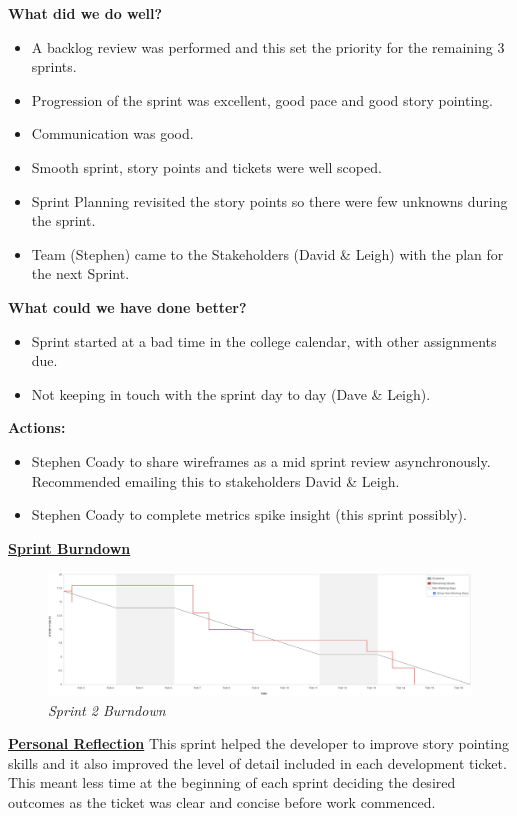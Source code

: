 \textbf{What did we do well?}
\begin{itemize}
	\item A backlog review was performed and this set the priority for the remaining 3 sprints.
	\item Progression of the sprint was excellent, good pace and good story pointing.
	\item Communication was good.
	\item Smooth sprint, story points and tickets were well scoped.
	\item Sprint Planning revisited the story points so there were few unknowns during the sprint.
	\item Team (Stephen) came to the Stakeholders (David \& Leigh) with the plan for the next Sprint.
\end{itemize}
\textbf{What could we have done better?}
\begin{itemize}
	\item Sprint started at a bad time in the college calendar, with other assignments due.
	\item Not keeping in touch with the sprint day to day (Dave \& Leigh).
\end{itemize}
\textbf{Actions:}
\begin{itemize}
	\item Stephen Coady to share wireframes as a mid sprint review asynchronously. Recommended emailing this to stakeholders David \& Leigh.
	\item Stephen Coady to complete metrics spike insight (this sprint possibly).
\end{itemize}

\underline{\textbf{Sprint Burndown}}\newline
\begin{figure}[!ht]
\centering
\includegraphics*[width=\textwidth]{images/sprint2}
\caption{\em Sprint 2 Burndown}
\label{fig:sprint2}
\end{figure}

\underline{\textbf{Personal Reflection}}\newline
This sprint helped the developer to improve story pointing skills and it also improved the level of detail included in each development ticket. This meant less time at the beginning of each sprint deciding the desired outcomes as the ticket was clear and concise before work commenced.

